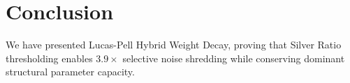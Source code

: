 \section{Conclusion}
We have presented Lucas-Pell Hybrid Weight Decay, proving that Silver Ratio thresholding enables $3.9\times$ selective noise shredding while conserving dominant structural parameter capacity.